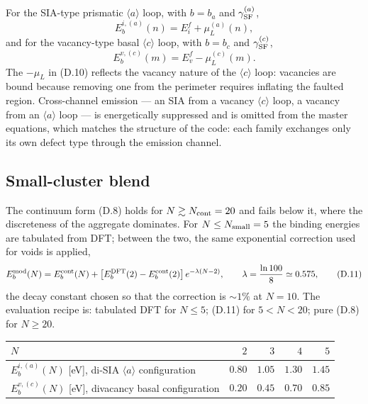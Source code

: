 \documentclass[11pt]{article}
\newcommand{\aloop}{\ensuremath{\langle a\rangle}}
\newcommand{\cloop}{\ensuremath{\langle c\rangle}}
\newcommand{\GSF}{\gamma_{\rm SF}}
\begin{document}
For the SIA-type prismatic \aloop{} loop, with $b=b_a$ and $\GSF^{(a)}$,
\begin{equation*}
E_b^{i,(a)}(n)=E_i^{f}+\mu_L^{(a)}(n) ,
\tag{D.9}
\end{equation*}
and for the vacancy-type basal \cloop{} loop, with $b=b_c$ and
$\GSF^{(c)}$,
\begin{equation*}
E_b^{v,(c)}(m)=E_v^{f}-\mu_L^{(c)}(m) .
\tag{D.10}
\end{equation*}
The $-\mu_L$ in (D.10) reflects the vacancy nature of the \cloop{} loop:
vacancies are bound because removing one from the perimeter requires
inflating the faulted region.  Cross-channel emission --- an SIA from a
vacancy \cloop{} loop, a vacancy from an \aloop{} loop --- is energetically
suppressed and is omitted from the master equations, which matches the
structure of the code: each family exchanges only its own defect type through
the emission channel.

\subsection{Small-cluster blend}
\label{sec:blend}

The continuum form (D.8) holds for $N\gtrsim N_{\rm cont}=20$ and fails below
it, where the discreteness of the aggregate dominates.  For
$N\le N_{\rm small}=5$ the binding energies are tabulated from DFT; between
the two, the same exponential correction used for voids is applied,
\begin{equation*}
E_b^{\rm mod}(N)=E_b^{\rm cont}(N)
  +\bigl[E_b^{\rm DFT}(2)-E_b^{\rm cont}(2)\bigr]\,e^{-\lambda(N-2)},
\qquad \lambda=\frac{\ln 100}{8}\simeq0.575 ,
\tag{D.11}
\end{equation*}
the decay constant chosen so that the correction is $\sim1\%$ at $N=10$.  The
evaluation recipe is: tabulated DFT for $N\le5$; (D.11) for $5<N<20$; pure
(D.8) for $N\ge20$.

\begin{center}\small
\begin{tabular}{@{}lrrrr@{}}
\toprule
$N$ & $2$ & $3$ & $4$ & $5$\\
\midrule
$E_b^{i,(a)}(N)$ [eV], di-SIA \aloop{} configuration
  & $0.80$ & $1.05$ & $1.30$ & $1.45$\\
$E_b^{v,(c)}(N)$ [eV], divacancy basal configuration
  & $0.20$ & $0.45$ & $0.70$ & $0.85$\\
\bottomrule
\end{tabular}
\end{center}
\end{document}
